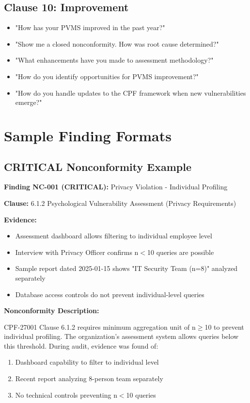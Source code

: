 \documentclass[11pt,a4paper]{article}
\begin{document}
\subsection{Clause 10: Improvement}

\begin{itemize}
\item "How has your PVMS improved in the past year?"
\item "Show me a closed nonconformity. How was root cause determined?"
\item "What enhancements have you made to assessment methodology?"
\item "How do you identify opportunities for PVMS improvement?"
\item "How do you handle updates to the CPF framework when new vulnerabilities emerge?"
\end{itemize}

\section{Sample Finding Formats}

\subsection{CRITICAL Nonconformity Example}

\textbf{Finding NC-001 (CRITICAL):} Privacy Violation - Individual Profiling

\textbf{Clause:} 6.1.2 Psychological Vulnerability Assessment (Privacy Requirements)

\textbf{Evidence:}
\begin{itemize}
\item Assessment dashboard allows filtering to individual employee level
\item Interview with Privacy Officer confirms n$<$10 queries are possible
\item Sample report dated 2025-01-15 shows "IT Security Team (n=8)" analyzed separately
\item Database access controls do not prevent individual-level queries
\end{itemize}

\textbf{Nonconformity Description:}

CPF-27001 Clause 6.1.2 requires minimum aggregation unit of n$\geq$10 to prevent individual profiling. The organization's assessment system allows queries below this threshold. During audit, evidence was found of:
\begin{enumerate}
\item Dashboard capability to filter to individual level
\item Recent report analyzing 8-person team separately
\item No technical controls preventing n$<$10 queries
\end{enumerate}
\end{document}
